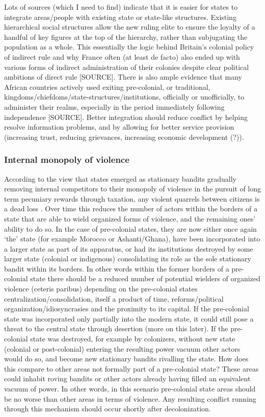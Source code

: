 \documentclass[12pt]{article}
\begin{document}
Lots of sources (which I need to find) indicate that it is easier for states to
integrate areas/people with existing state or state-like structures. Existing
hierarchical social structures allow the new ruling elite to ensure the loyalty
of a handful of key figures at the top of the hierarchy, rather than subjugating
the population as a whole. This essentially the logic behind Britain's colonial
policy of indirect rule and why France often (at least de facto) also ended up
with various forms of indirect administration of their colonies despite clear
political ambitions of direct rule [SOURCE]. There is also ample evidence that
many African countries actively used exiting pre-colonial, or traditional,
kingdoms/chiefdoms/state-structures/institutions, officially or unofficially, to
administer their realms, especially in the period immediately following
independence [SOURCE]. Better integration should reduce conflict by helping
resolve information problems, and by allowing for better service provision
(increasing trust, reducing grievances, increasing economic development (?)).

\subsubsection{Internal monopoly of violence}

According to the view that states emerged as stationary bandits gradually
removing internal competitors to their monopoly of violence in the pursuit of
long term pecuniary rewards through taxation, any violent quarrels between
citizens is a dead loss \citep{Olson1993, tilly_1985}. Over time this reduces
the number of actors within the borders of a state that are able to wield
organized forms of violence, and the remaining ones' ability to do so. In the
case of pre-colonial states, they are now either once again `the' state (for
example Morocco or Ashanti/Ghana), have been incorporated into a larger state as
part of its apparatus, or had its institutions destroyed by some larger state
(colonial or indigenous) consolidating its role as the sole stationary bandit
within its borders. In other words within the former borders of a pre-colonial
state there should be a reduced number of potential wielders of organized
violence (ceteris paribus) depending on the pre-colonial states
centralization/consolidation, itself a product of time, reforms/political
organization/idiosyncrasies and the proximity to its capital. If the
pre-colonial state was incorporated only partially into the modern state, it
could still pose a threat to the central state through desertion (more on this
later). If the pre-colonial state was destroyed, for example by colonizers,
without new state (colonial or post-colonial) entering the resulting power
vacuum other actors would do so, and become new stationary bandits rivalling the
state. How does this compare to other areas not formally part of a pre-colonial
state? These areas could inhabit roving bandits \citep{Scott2009} or other
actors already having filled an equivalent vacuum of power. In other words, in
this scenario pre-colonial state areas should be no worse than other areas in
terms of violence. Any resulting conflict running through this mechanism should
occur shortly after decolonization.
\end{document}
